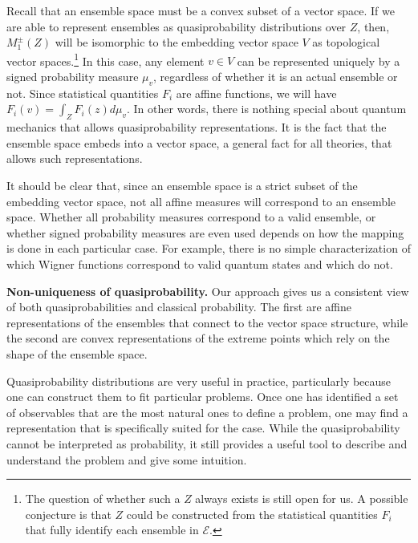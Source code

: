 \documentclass[10pt,twocolumn, nofootinbib]{revtex4-2}
\newcommand{\Ens}[1][E] {\mathcal{#1}} %
\begin{document}
Recall that an ensemble space must be a convex subset of a vector space. If we are able to represent ensembles as quasiprobability distributions over $Z$, then, $M_1^{\pm}(Z)$ will be isomorphic to the embedding vector space $V$ as topological vector spaces.\footnote{The question of whether such a $Z$ always exists is still open for us. A possible conjecture is that $Z$ could be constructed from the statistical quantities $F_i$ that fully identify each ensemble in $\Ens$.} In this case, any element $v\in V$ can be represented uniquely by a signed probability measure $\mu_{v}$, regardless of whether it is an actual ensemble or not. Since statistical quantities $F_i$ are affine functions, we will have $F_i(v) = \int_Z F_i(z) d\mu_{v}$. In other words, there is nothing special about quantum mechanics that allows quasiprobability representations. It is the fact that the ensemble space embeds into a vector space, a general fact for all theories, that allows such representations.

It should be clear that, since an ensemble space is a strict subset of the embedding vector space, not all affine measures will correspond to an ensemble space. Whether all probability measures correspond to a valid ensemble, or whether signed probability measures are even used depends on how the mapping is done in each particular case. For example, there is no simple characterization of which Wigner functions correspond to valid quantum states and which do not.


\textbf{Non-uniqueness of quasiprobability.} Our approach gives us a consistent view of both quasiprobabilities and classical probability. The first are affine representations of the ensembles that connect to the vector space structure, while the second are convex representations of the extreme points which rely on the shape of the ensemble space.

Quasiprobability distributions are very useful in practice, particularly because one can construct them to fit particular problems. Once one has identified a set of observables that are the most natural ones to define a problem, one may find a representation that is specifically suited for the case. While the quasiprobability cannot be interpreted as probability, it still provides a useful tool to describe and understand the problem and give some intuition.
\end{document}
